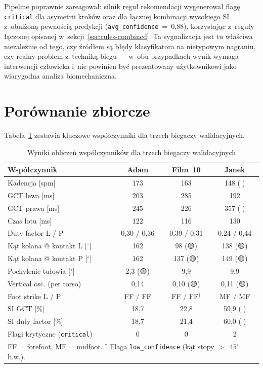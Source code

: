 Pipeline poprawnie zareagował: silnik reguł rekomendacji wygenerował flagę \texttt{critical} dla asymetrii kroków oraz dla łącznej kombinacji wysokiego SI z~obniżoną pewnością predykcji (\texttt{avg\_confidence}~=~0{,}88), korzystając z~reguły łączonej opisanej w~sekcji~\ref{sec:rules-combined}. Ta sygnalizacja jest tu właściwa niezależnie od tego, czy źródłem są błędy klasyfikatora na nietypowym nagraniu, czy realny problem z~techniką biegu --- w~obu przypadkach wynik wymaga interwencji człowieka i~nie powinien być prezentowany użytkownikowi jako wiarygodna analiza biomechaniczna.

\section{Porównanie zbiorcze}
\label{sec:porownanie-zbiorcze}

Tabela~\ref{tab:wsp-zbiorcza} zestawia kluczowe współczynniki dla trzech biegaczy walidacyjnych.

\begin{table}[htbp]
\centering
\caption{Wyniki obliczeń współczynników dla trzech biegaczy walidacyjnych}
\label{tab:wsp-zbiorcza}
\small
\begin{tabular}{lccc}
\hline
\textbf{Współczynnik} & \textbf{Adam} & \textbf{Film~10} & \textbf{Janek} \\
\hline
Kadencja [spm]                       & 173      & 163      & 148 (🔴) \\
GCT lewa [ms]                        & 203      & 285      & 192 \\
GCT prawa [ms]                       & 245      & 226      & 357 (🔴) \\
Czas lotu [ms]                       & 122      & 116      & 130 \\
Duty factor L / P                    & 0{,}30 / 0{,}36 & 0{,}39 / 0{,}31 & 0{,}24 / 0{,}44 \\
Kąt kolana @ kontakt L [$^\circ$]    & 162      & 98 (🟡)  & 138 (🟡) \\
Kąt kolana @ kontakt P [$^\circ$]    & 162      & 137 (🟡) & 149 (🟡) \\
Pochylenie tułowia [$^\circ$]        & 2{,}3 (🟡) & 9{,}9    & 9{,}9 \\
Vertical osc. (per torso)            & 0{,}14   & 0{,}10 (🟡) & 0{,}11 (🟡) \\
Foot strike L / P                    & FF / FF  & FF / FF$^\dagger$ & MF / MF \\
SI GCT [\%]                          & 18{,}7   & 22{,}8   & 59{,}9 (🔴) \\
SI duty factor [\%]                  & 18{,}7   & 21{,}4   & 60{,}0 (🔴) \\
Flagi krytyczne (\texttt{critical})  & 0        & 0        & 2 \\
\hline
\multicolumn{4}{l}{\footnotesize FF = forefoot, MF = midfoot. $^\dagger$ Flaga \texttt{low\_confidence} (kąt stopy $>$~$45^\circ$ b.w.).} \\
\end{tabular}
\end{table}

